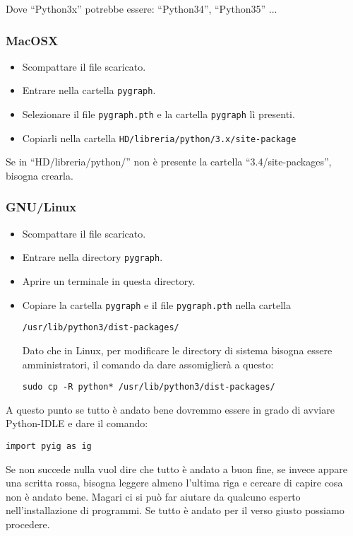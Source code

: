 Dove ``Python3x'' potrebbe essere: ``Python34'', ``Python35'' ...

\subsubsection*{MacOSX}

\begin{itemize} [noitemsep]
\item {} Scompattare il file scaricato.
\item {} Entrare nella cartella \texttt{pygraph}.
\item {} Selezionare il file \texttt{pygraph.pth} e la cartella 
  \texttt{pygraph} lì presenti.
\item {} Copiarli nella cartella \texttt{HD/libreria/python/3.x/site-package}
\end{itemize}

Se in ``HD/libreria/python/'' non è presente la cartella 
``3.4/site-packages'', bisogna crearla.

\subsubsection*{GNU/Linux}

\begin{itemize} [noitemsep]
\item {} Scompattare il file scaricato.
\item {} Entrare nella directory \texttt{pygraph}.
\item {} Aprire un terminale in questa directory.
\item {} Copiare la cartella \texttt{pygraph} e il file \texttt{pygraph.pth}
  nella cartella
  
  \texttt{/usr/lib/python3/dist-packages/}
  
  Dato che in Linux, per modificare le directory di sistema bisogna essere 
  amministratori, il comando da dare assomiglierà a questo:
  
  \texttt{sudo cp -R python* /usr/lib/python3/dist-packages/}
\end{itemize}

A questo punto se tutto è andato bene dovremmo essere in grado di avviare 
Python-IDLE e dare il comando:

\texttt{import pyig as ig}

Se non succede nulla vuol dire che tutto è andato a buon fine, 
se invece appare una scritta rossa, bisogna leggere almeno l'ultima riga
e cercare di capire cosa non è andato bene. Magari ci si può far aiutare
da qualcuno esperto nell'installazione di programmi.
Se tutto è andato per il verso giusto possiamo procedere.

